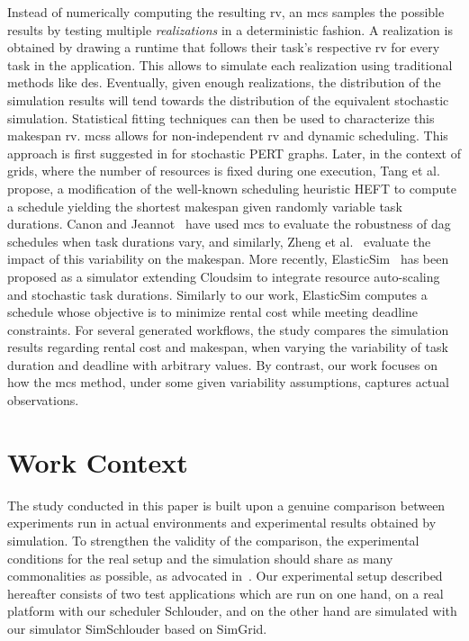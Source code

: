 \documentclass[]{llncs}
\begin{document}
Instead of numerically computing the  resulting \ac{rv}, an \ac{mcs} samples the
possible  results by  testing  multiple \emph{realizations}  in a  deterministic
fashion.  A  realization is  obtained by  drawing a  runtime that  follows their
task's respective  \ac{rv} for every  task in  the application.  This  allows to
simulate each realization using  traditional methods like \ac{des}.  Eventually,
given enough realizations, the distribution  of the simulation results will tend
towards the  distribution of the equivalent  stochastic simulation.  Statistical
fitting   techniques  can   then   be  used   to   characterize  this   makespan
\ac{rv}. \acp{mcs} allows for non-independent \ac{rv} and dynamic
scheduling.
This approach is first suggested in
\cite{Slyke63}  for stochastic  PERT graphs.   
Later, in the  context of grids, where  the number of resources  is fixed during
one execution, Tang et al.~\cite{Tang11} propose, a modification of the well-known
scheduling heuristic HEFT to compute a schedule yielding the shortest makespan
given randomly variable task durations. Canon and Jeannot~\cite{Canon10} have
used \ac{mcs} to evaluate the robustness of \ac{dag}
schedules when task  durations vary, and similarly,  Zheng et al.~\cite{Zheng13}
evaluate  the  impact of  this  variability  on  the makespan.   More  recently,
ElasticSim~\cite{Cai17} has been  proposed as a simulator  extending Cloudsim to
integrate resource auto-scaling and stochastic  task durations. Similarly to our
work, ElasticSim computes a schedule whose  objective is to minimize rental cost
while meeting deadline constraints.  For  several generated workflows, the study
compares the simulation results regarding rental cost and makespan, when varying
the  variability  of task  duration  and  deadline  with arbitrary  values.   By
contrast,  our  work focuses  on  how  the  \ac{mcs}  method, under  some  given
variability assumptions, captures actual observations.


\section{Work Context}
\label{sec:work-context}

The study  conducted in this  paper is built  upon a genuine  comparison between
experiments  run in  actual environments  and experimental  results obtained  by
simulation.   To strengthen  the validity  of the  comparison, the  experimental
conditions  for  the  real  setup  and  the  simulation  should  share  as  many
commonalities as possible, as advocated in~\cite{PucherGWK15}.  Our experimental
setup described hereafter consists of two test applications which are run on one
hand, on a real platform with our scheduler Schlouder, and on the other hand are
simulated with our simulator SimSchlouder based on SimGrid.
\end{document}
